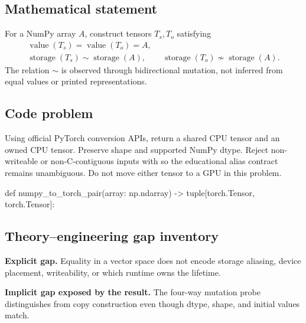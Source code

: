 
        \subsection{Mathematical statement}


For a NumPy array $A$, construct tensors $T_s,T_o$ satisfying
\[
\begin{gathered}
\operatorname{value}(T_s)=\operatorname{value}(T_o)=A,\\
\operatorname{storage}(T_s)\sim\operatorname{storage}(A),\qquad
\operatorname{storage}(T_o)\not\sim\operatorname{storage}(A).
\end{gathered}
\]
The relation $\sim$ is observed through bidirectional mutation, not inferred
from equal values or printed representations.


        \subsection{Code problem}


Using official PyTorch conversion APIs, return a shared CPU tensor and an owned
CPU tensor.  Preserve shape and supported NumPy dtype.  Reject non-writeable or
non-C-contiguous inputs with  so the educational alias
contract remains unambiguous.
Do not move either tensor to a GPU in this problem.


        \begin{contractbox}
        \begin{Code}
        def numpy_to_torch_pair(array: np.ndarray) -> tuple[torch.Tensor, torch.Tensor]:
        \end{Code}
        \end{contractbox}

        \subsection{Theory--engineering gap inventory}

        \begin{gapbox}
        \textbf{Explicit gap.} Equality in a vector space does not encode storage aliasing, device placement, writeability, or which runtime owns the lifetime.

        \textbf{Implicit gap exposed by the result.} The four-way mutation probe distinguishes  from copy construction even though dtype, shape, and initial values match.
        \end{gapbox}

